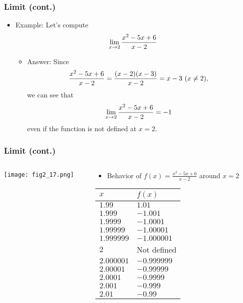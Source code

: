 \documentclass[pdflatex, 12pt]{beamer}
\begin{document}
\begin{frame}
\frametitle{Limit (cont.)}
\begin{itemize}
\item Example: Let's compute 
 \begin{equation}
 \lim_{x \to 2} \frac{x^2 - 5x + 6}{x - 2} \notag
 \end{equation}
 \begin{itemize}
 \item Answer: Since
  \begin{equation}
  \frac{x^2 - 5x + 6}{x - 2} = \frac{(x - 2)(x - 3)}{x - 2} = x - 3 \ (x \neq 2), \notag
  \end{equation}
  we can see that
  \begin{equation}
  \lim_{x \to 2} \frac{x^2 - 5x + 6}{x - 2} = -1 \notag
  \end{equation}
  even if the function is not defined at $x = 2$.
 \end{itemize}
\end{itemize}
\end{frame}

\begin{frame}
\frametitle{Limit (cont.)}
\begin{columns}
\begin{column}{0.5\textwidth}
\centering
\texttt{[image: fig2\_17.png]}
\end{column}
\begin{column}{0.5\textwidth}
\begin{itemize}
\item Behavior of $f(x) = \frac{x^2 - 5x + 6}{x - 2}$ around $x = 2$
\end{itemize}
\begin{tabular}{l l}
\hline\hline
$x$ & $f(x)$ \\\hline
$1.99$ & $1.01$ \\
$1.999$ & $-1.001$ \\
$1.9999$ & $-1.0001$ \\
$1.99999$ & $-1.00001$ \\
$1.999999$ & $-1.000001$ \\
$2$ & Not defined \\
$2.000001$ & $-0.999999$ \\
$2.00001$ & $-0.99999$ \\
$2.0001$ & $-0.9999$ \\
$2.001$ & $-0.999$ \\
$2.01$ & $-0.99$ \\\hline
\end{tabular}
\end{column}
\end{columns}
\end{frame}
\end{document}
